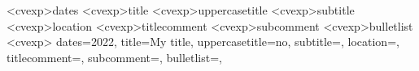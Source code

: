 \newcommand{\datesstyle}[1]{
    \textbf{#1}
}

\newcommand{\titlestyle}[1]{
    \textcolor{hltxt}{\textbf{#1}}
}

\newcommand{\subtitlestyle}[1]{
    \ifthenelse{\equal{#1}{}}
    {
        \vspace{-\baselineskip}
    }{\textcolor{subhltxt}{\textit{\textbf{#1}}}}
}

\newcommand{\locationstyle}[1]{
    \ifthenelse{\equal{#1}{}}
    {}{\textit{#1}}
}

\newcommand{\titlecommentstyle}[1]{
    \ifthenelse{\equal{#1}{}}
    {
        \vspace{-\baselineskip}
    }{#1}
}

\newcommand{\subcommentstyle}[1]{
    \ifthenelse{\equal{#1}{}}
    {
        \vspace{-\baselineskip}
    }{\scriptsize{\emph{#1}}}
}

\newcommand{\bulletliststyle}[1]{
    \ifthenelse{\equal{#1}{}}{}{
        \vspace{\vspacebulletvalue}
        \readlist\mylist{#1}%
        \begin{itemize} 
            \foreachitem\z\in\mylist[]{
                \item \z
            }
        \end{itemize}
        \bulletpadding
    }
}



\DeclareOptionX<cvexp>{dates}{\def\dates{#1}}
\DeclareOptionX<cvexp>{title}{\def\title{#1}}
\DeclareOptionX<cvexp>{uppercasetitle}{\def\uppercasetitle{#1}}
\DeclareOptionX<cvexp>{subtitle}{\def\subtitle{#1}}
\DeclareOptionX<cvexp>{location}{\def\location{#1}}
\DeclareOptionX<cvexp>{titlecomment}{\def\titlecomment{#1}}
\DeclareOptionX<cvexp>{subcomment}{\def\subcommentstyle{#1$}}
\DeclareOptionX<cvexp>{bulletlist}{\def\bulletlist{#1}}
\ExecuteOptionsX<cvexp>{
    dates=2022,
    title=My title,
    uppercasetitle=no,
    subtitle=,
    location=,
    titlecomment=,
    subcomment=,
    bulletlist={},
}


